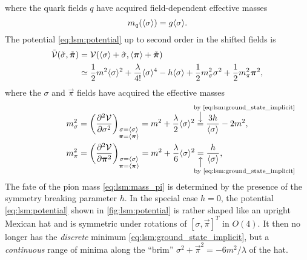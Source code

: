 where the quark fields $q$ have acquired field-dependent effective masses
\begin{equation}
	m_q(\langle \sigma \rangle) = g \langle \sigma \rangle .
\label{eq:lsm:mass_quark}
\end{equation}
The potential \eqref{eq:lsm:potential} up to second order in the shifted fields is
\begin{equation}
\begin{split}
	\tilde{\mathcal{V}}(\tilde{\sigma},\tilde{{\bm{\pi}}}) &= \mathcal{V}(\langle \sigma \rangle+\tilde{\sigma},\langle {\bm{\pi}} \rangle+\tilde{{\bm{\pi}}}) \\
	                                             &\simeq \frac12 m^2 \langle \sigma \rangle^2 + \frac{\lambda}{4!} \langle \sigma \rangle^4 - h \langle \sigma \rangle + \frac12 m_\sigma^2 \sigma^2  + \frac12 m_\pi^2 {\bm{\pi}}^2 ,
\label{eq:lsm:potential_shifted}
\end{split}
\end{equation}
where the $\sigma$ and $\vec\pi$ fields have acquired the effective masses
\begin{subequations}
\begin{align}
	m_\sigma^2 &= \pdv[2]{\pot}{\sigma}_{\substack{\sigma=\avg{\sigma}\\\vec{\pi}=\avg{\vec{\pi}}}}    = m^2 + \frac{\lambda}{2} \avg{\sigma}^2 \equalexplabove{\text{by \eqref{eq:lsm:ground_state_implicit}}} \frac{3h}{\avg{\sigma}} - 2 m^2 , \label{eq:lsm:mass_sigma} \\
	m_\pi^2    &= \pdv[2]{\pot}{\vec{\pi}}_{\substack{\sigma=\avg{\sigma}\\\vec{\pi}=\avg{\vec{\pi}}}} = m^2 + \frac{\lambda}{6} \avg{\sigma}^2 \equalexplbelow{\text{by \eqref{eq:lsm:ground_state_implicit}}} \frac{h}{\avg{\sigma}} , \label{eq:lsm:mass_pi}
\end{align}%
\label{eq:lsm:mass_sigmapi}%
\end{subequations}%
The fate of the pion mass \eqref{eq:lsm:mass_pi} is determined by the presence of the symmetry breaking parameter $h$.
In the special case $h = 0$, the potential \eqref{eq:lsm:potential} shown in \cref{fig:lsm:potential} is rather shaped like an upright Mexican hat and is symmetric under rotations of $[\sigma,\vec{\pi}]^T$ in $O(4)$.
It then no longer has the \emph{discrete} minimum \eqref{eq:lsm:ground_state_implicit}, but a \emph{continuous} range of minima along the ``brim'' $\sigma^2 + \vec{\pi}^2 = -6m^2/\lambda$ of the hat.
